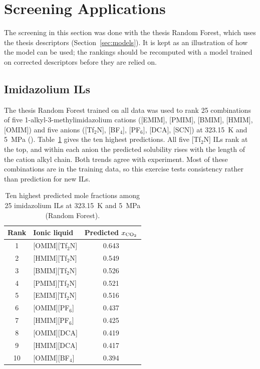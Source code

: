\section{Screening Applications}
\label{sec:screening}

The screening in this section was done with the thesis Random Forest, which uses the thesis descriptors (Section~\ref{sec:models}). It is kept as an illustration of how the model can be used; the rankings should be recomputed with a model trained on corrected descriptors before they are relied on.

\subsection{Imidazolium ILs}
The thesis Random Forest trained on all data was used to rank 25 combinations of five 1-alkyl-3-methylimidazolium cations ([EMIM], [PMIM], [BMIM], [HMIM], [OMIM]) and five anions ([Tf$_2$N], [BF$_4$], [PF$_6$], [DCA], [SCN]) at 323.15~K and 5~MPa (). Table~\ref{tab:screen} gives the ten highest predictions. All five [Tf$_2$N] ILs rank at the top, and within each anion the predicted solubility rises with the length of the cation alkyl chain. Both trends agree with experiment\cite{anthony2005anion, aki2004high}. Most of these combinations are in the training data, so this exercise tests consistency rather than prediction for new ILs.

\begin{table}[t]
\caption{Ten highest predicted \co{} mole fractions among 25 imidazolium ILs at 323.15~K and 5~MPa (Random Forest).}
\label{tab:screen}
\centering
\begin{tabular}{clc}
\toprule
\textbf{Rank} & \textbf{Ionic liquid} & \textbf{Predicted $x_{\mathrm{CO_2}}$} \\
\midrule
1 & [OMIM][Tf$_2$N] & 0.643 \\
2 & [HMIM][Tf$_2$N] & 0.549 \\
3 & [BMIM][Tf$_2$N] & 0.526 \\
4 & [PMIM][Tf$_2$N] & 0.521 \\
5 & [EMIM][Tf$_2$N] & 0.516 \\
6 & [OMIM][PF$_6$] & 0.437 \\
7 & [HMIM][PF$_6$] & 0.425 \\
8 & [OMIM][DCA] & 0.419 \\
9 & [HMIM][DCA] & 0.417 \\
10 & [OMIM][BF$_4$] & 0.394 \\
\bottomrule
\end{tabular}
\end{table}

